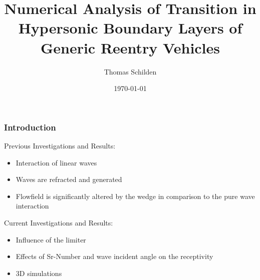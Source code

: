 \documentclass[t]{beamer}
\title{Numerical Analysis of Transition in Hypersonic Boundary Layers of Generic Reentry Vehicles}
\author{Thomas Schilden}
\institute{Institute of Aerodynamics\\RWTH Aachen University}
\date{\today}
\begin{document}
%
\frame{\titlepage}
\usebackgroundtemplate{}
%
\setcounter{framenumber}{0}
%
\begin{frame}
\frametitle{Introduction}
\begin{block}{Previous Investigations and Results:}
\begin{itemize}
 \item Interaction of linear waves
 \item Waves are refracted and generated
 \item Flowfield is significantly altered by the wedge in comparison to the pure wave interaction
\end{itemize}
\end{block}
\begin{block}{Current Investigations and Results:}
\begin{itemize}
 \item Influence of the limiter
 \item Effects of Sr-Number and wave incident angle on the receptivity
 \item 3D simulations
\end{itemize}
\end{block}
\end{frame}
\end{document}
